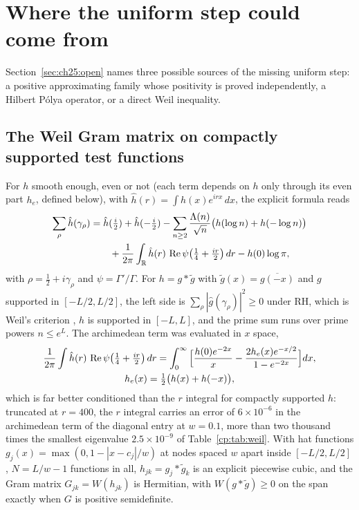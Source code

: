\section{Where the uniform step could come from}\label{cp:sec:uniform}

Section~\ref{sec:ch25:open} names three possible sources of the missing uniform step: a positive approximating family whose positivity is proved independently, a Hilbert P\'olya operator, or a direct Weil inequality.

\subsection{The Weil Gram matrix on compactly supported test functions}\label{cp:sec:weil}

For $h$ smooth enough, even or not (each term depends on $h$ only through its even part $h_e$, defined below), with $\hat h(r)=\int h(x)e^{irx}\,dx$, the explicit formula reads
\[\begin{aligned}
\sum_\rho\hat h(\gamma_\rho)&=\hat h(\tfrac i2)+\hat h(-\tfrac i2)-\sum_{n\ge2}\frac{\Lambda(n)}{\sqrt n}\big(h(\log n)+h(-\log n)\big)\\&\qquad+\frac1{2\pi}\int_{\mathbb{R}}\hat h(r)\,\operatorname{Re}\psi\big(\tfrac14+\tfrac{ir}2\big)\,dr-h(0)\log\pi,
\end{aligned}\]
with $\rho=\frac12+i\gamma_\rho$ and $\psi=\Gamma'/\Gamma$. For $h=g*\tilde g$ with $\tilde g(x)=\overline{g(-x)}$ and $g$ supported in $[-L/2,L/2]$, the left side is $\sum_\rho|\hat g(\gamma_\rho)|^2\ge0$ under RH, which is Weil's criterion \cite{Weil52}, $h$ is supported in $[-L,L]$, and the prime sum runs over prime powers $n\le e^L$. The archimedean term was evaluated in $x$ space,
\[\begin{gathered}
\frac1{2\pi}\int\hat h(r)\,\operatorname{Re}\psi\big(\tfrac14+\tfrac{ir}2\big)\,dr=\int_0^\infty\Big[\frac{h(0)e^{-2x}}x-\frac{2h_e(x)e^{-x/2}}{1-e^{-2x}}\Big]dx,\\ h_e(x)=\tfrac12\big(h(x)+h(-x)\big),
\end{gathered}\]
which is far better conditioned than the $r$ integral for compactly supported $h$: truncated at $r=400$, the $r$ integral carries an error of $6\times10^{-6}$ in the archimedean term of the diagonal entry at $w=0.1$, more than two thousand times the smallest eigenvalue $2.5\times10^{-9}$ of Table~\ref{cp:tab:weil}. With hat functions $g_j(x)=\max(0,1-|x-c_j|/w)$ at nodes spaced $w$ apart inside $[-L/2,L/2]$, $N=L/w-1$ functions in all, $h_{jk}=g_j*\tilde g_k$ is an explicit piecewise cubic, and the Gram matrix $G_{jk}=W(h_{jk})$ is Hermitian, with $W(g*\tilde g)\ge0$ on the span exactly when $G$ is positive semidefinite.

